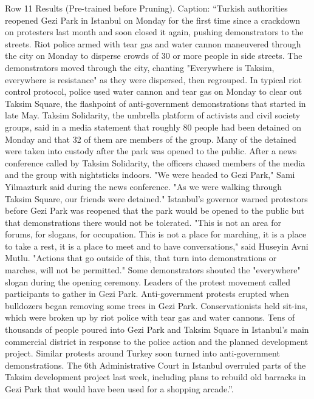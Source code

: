\begin{table}[H]
\centering
\caption{Row 11 Results (Pre-trained before Pruning). \ifshowcaption{}Caption: ``Turkish authorities reopened Gezi Park in Istanbul on Monday for the first time since a crackdown on protesters last month and soon closed it again, pushing demonstrators to the streets. Riot police armed with tear gas and water cannon maneuvered through the city on Monday to disperse crowds of 30 or more people in side streets. The demonstrators moved through the city, chanting "Everywhere is Taksim, everywhere is resistance" as they were dispersed, then regrouped. In typical riot control protocol, police used water cannon and tear gas on Monday to clear out Taksim Square, the flashpoint of anti-government demonstrations that started in late May. Taksim Solidarity, the umbrella platform of activists and civil society groups, said in a media statement that roughly 80 people had been detained on Monday and that 32 of them are members of the group. Many of the detained were taken into custody after the park was opened to the public. After a news conference called by Taksim Solidarity, the officers chased members of the media and the group with nightsticks indoors. "We were headed to Gezi Park," Sami Yilmazturk said during the news conference. "As we were walking through Taksim Square, our friends were detained." Istanbul's governor warned protestors before Gezi Park was reopened that the park would be opened to the public but that demonstrations there would not be tolerated. "This is not an area for forums, for slogans, for occupation. This is not a place for marching, it is a place to take a rest, it is a place to meet and to have conversations," said Huseyin Avni Mutlu. "Actions that go outside of this, that turn into demonstrations or marches, will not be permitted." Some demonstrators shouted the "everywhere" slogan during the opening ceremony. Leaders of the protest movement called participants to gather in Gezi Park. Anti-government protests erupted when bulldozers began removing some trees in Gezi Park. Conservationists held sit-ins, which were broken up by riot police with tear gas and water cannons. Tens of thousands of people poured into Gezi Park and Taksim Square in Istanbul's main commercial district in response to the police action and the planned development project. Similar protests around Turkey soon turned into anti-government demonstrations. The 6th Administrative Court in Istanbul overruled parts of the Taksim development project last week, including plans to rebuild old barracks in Gezi Park that would have been used for a shopping arcade.''.\fi}

\end{table}
